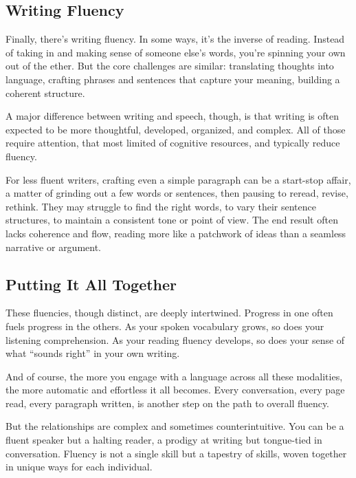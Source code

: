 \subsection{Writing Fluency}

Finally, there's writing fluency. In some ways, it's the inverse of reading. Instead of taking in and making sense of someone else's words, you're spinning your own out of the ether. But the core challenges are similar: translating thoughts into language, crafting phrases and sentences that capture your meaning, building a coherent structure.

A major difference between writing and speech, though, is that writing is often expected to be more thoughtful, developed, organized, and complex. All of those require attention, that most limited of cognitive resources, and typically reduce fluency.

For less fluent writers, crafting even a simple paragraph can be a start-stop affair, a matter of grinding out a few words or sentences, then pausing to reread, revise, rethink. They may struggle to find the right words, to vary their sentence structures, to maintain a consistent tone or point of view. The end result often lacks coherence and flow, reading more like a patchwork of ideas than a seamless narrative or argument.

\subsection{Putting It All Together}

These fluencies, though distinct, are deeply intertwined. Progress in one often fuels progress in the others. As your spoken vocabulary grows, so does your listening comprehension. As your reading fluency develops, so does your sense of what ``sounds right'' in your own writing.

And of course, the more you engage with a language across all these modalities, the more automatic and effortless it all becomes. Every conversation, every page read, every paragraph written, is another step on the path to overall fluency.

But the relationships are complex and sometimes counterintuitive. You can be a fluent speaker but a halting reader, a prodigy at writing but tongue-tied in conversation. Fluency is not a single skill but a tapestry of skills, woven together in unique ways for each individual.

